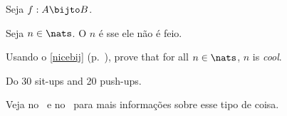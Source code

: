 \begin{problem}
\label{nicebij}
Seja $f: A \bijto B$.
\end{problem}

\begin{definition}
Seja $n\in\nats$.  O $n$ é 
sse ele não é feio.
\end{definition}

\begin{exercise}
Usando o \ref{nicebij} (p.~\pageref{nicebij}), prove that for all $n\in\nats$, $n$ is \emph{cool}.
\end{exercise}

\begin{homework}
Do 30 sit-ups and 20 push-ups.
\end{homework}

\begin{notes}
    Veja no~\cite[\S2.3]{velleman} e no~\cite[cap.~4]{pinter}
    para mais informações sobre esse tipo de coisa.
\end{notes}

